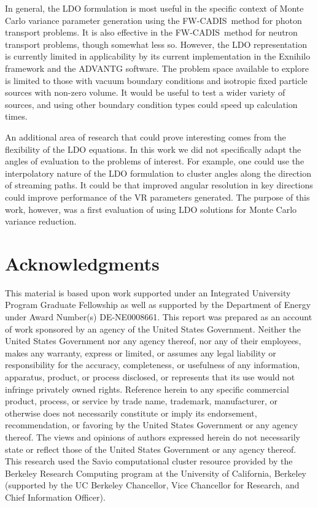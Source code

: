 \documentclass{article} %
\newcommand{\fwc}{\mbox{FW-CADIS}}
\begin{document}
In general, the LDO formulation is most useful in the specific context of
Monte Carlo variance parameter generation using the \fwc\ method for photon
transport problems. It is also effective in the \fwc\ method for neutron
transport problems, though somewhat less so. However, the LDO representation
is currently limited in applicability by its current implementation in the
Exnihilo framework and the ADVANTG software. The problem space available to
explore is limited to those with vacuum boundary conditions and isotropic
fixed particle sources with non-zero volume. It would be useful to test a
wider variety of sources, and using other boundary condition types could speed
up calculation times.

An additional area of research that could prove interesting comes from the
flexibility of the LDO equations. In this work we did not specifically adapt
the angles of evaluation to the problems of interest. For example, one could
use the interpolatory nature of the LDO formulation to cluster angles along
the direction of streaming paths. It could be that improved angular resolution
in key directions could improve performance of the VR parameters generated.
The purpose of this work, however, was a first evaluation of using LDO
solutions for Monte Carlo variance reduction.

\pagebreak
\section*{Acknowledgments}

This material is based upon work supported under an Integrated
University Program Graduate Fellowship as well as supported by the Department 
of Energy under Award Number(s) DE-NE0008661. This report was prepared as an
account of work sponsored by an agency of the United States Government.
Neither the United States Government nor any agency thereof, nor any of their
employees, makes any warranty, express or limited, or assumes any legal
liability or responsibility for the accuracy, completeness, or usefulness of
any information, apparatus, product, or process disclosed, or represents that
its use would not infringe privately owned rights. Reference herein to any 
specific commercial product, process, or service by trade name, trademark, 
manufacturer, or otherwise does not necessarily constitute or imply its 
endorsement, recommendation, or favoring by the United States Government or
any agency thereof. The views and opinions of authors expressed herein do not 
necessarily state or reflect those of the United States Government or any 
agency thereof. This research used the Savio computational cluster resource 
provided by the Berkeley Research Computing program at the University of 
California, Berkeley (supported by the UC Berkeley Chancellor, Vice Chancellor
for Research, and Chief Information Officer).

\pagebreak



\end{document}
